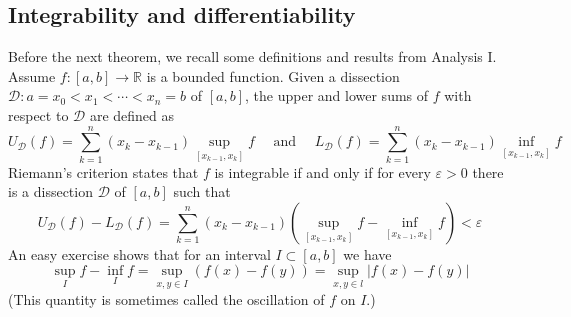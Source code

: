 \documentclass[a4paper]{article}
\begin{document}
\subsection{Integrability and differentiability}

Before the next theorem, we recall some definitions and results from Analysis I. Assume $f:[a, b] \rightarrow \mathbb{R}$ is a bounded function. Given a dissection $\mathcal{D}: a=x_{0}<x_{1}<\cdots<x_{n}=b$ of $[a, b]$, the upper and lower sums of $f$ with respect to $\mathcal{D}$ are defined as
\[
U_{\mathcal{D}}(f)=\sum_{k=1}^{n}\left(x_{k}-x_{k-1}\right) \sup _{\left[x_{k-1}, x_{k}\right]} f \quad \text { and } \quad L_{\mathcal{D}}(f)=\sum_{k=1}^{n}\left(x_{k}-x_{k-1}\right) \inf _{\left[x_{k-1}, x_{k}\right]} f
\]
Riemann's criterion states that $f$ is integrable if and only if for every $\varepsilon>0$ there is a dissection $\mathcal{D}$ of $[a, b]$ such that
\[
U_{\mathcal{D}}(f)-L_{\mathcal{D}}(f)=\sum_{k=1}^{n}\left(x_{k}-x_{k-1}\right)\left(\sup _{\left[x_{k-1}, x_{k}\right]} f-\inf _{\left[x_{k-1}, x_{k}\right]} f\right)<\varepsilon
\]
An easy exercise shows that for an interval $I \subset[a, b]$ we have
\[
\sup _{I} f-\inf _{I} f=\sup _{x, y \in I}(f(x)-f(y))=\sup _{x, y \in l}|f(x)-f(y)|
\]
(This quantity is sometimes called the oscillation of $f$ on $I$.)
\end{document}
